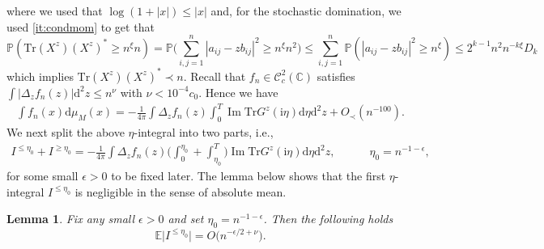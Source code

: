 \documentclass[10pt,reqno]{amsart}
\renewcommand{\Im}{\operatorname{Im}}
\newcommand{\C}{{\mathbb{C}}}
\newcommand{\II}{I^{\geq \eta_0}} %
\newcommand{\dd}{\mathrm{d}}
\newcommand{\ii}{\mathrm{i}}
\newcommand{\ie}{i.e., }
\newcommand{\<}{\langle}
\renewcommand{\>}{\rangle}
\numberwithin{equation}{section}
\newtheorem{lemma}[theorem]{Lemma}%
\begin{document}
where we used that $\log(1+|x|)\leq |x|$ and, for
the stochastic domination, we used 
\ref{it:condmom} to get that
\begin{equation}
\mathbb P(\mathrm{Tr}(X^{z})(X^{z})^* \geq n^\xi n)
= \mathbb P\Bigr(\sum_{i,j=1}^n |a_{ij} - z b_{ij}|^2
\geq n^\xi n^2\Bigr) \leq  \sum_{i,j=1}^n 
\mathbb P (|a_{ij} - z b_{ij}|^2 \geq n^\xi)
\leq 2^{k-1} n^2 n^{-k \xi} D_k
\end{equation}
which implies $\mathrm{Tr}(X^{z})(X^{z})^*\prec n$.
Recall that $f_n \in\mathcal{C}^2_c(\C)$ 
satisfies $\int |\Delta_z f_n(z)| \dd^2 z \leq n^{\nu}$ with $\nu<10^{-4}c_0$. Hence we have 
\begin{align}
     \int f_n(x)\dd\mu_M(x)=-\frac{1}{4\pi} \int \Delta_z f_n(z) \int_{0}^{T} \Im \mathrm{Tr} G^{z}(\ii \eta) \dd \eta \dd^2 z+O_\prec(n^{-100}). %
\end{align}
We next split the above $\eta$-integral into two parts, \ie 
\begin{align}\label{split_I}
    I^{\leq\eta_0}+\II=-\frac{1}{4\pi} \int \Delta_z f_n(z) \Big(  \int_{0}^{\eta_0}+\int_{\eta_0}^{T}\Big) \Im \mathrm{Tr} G^{z}(\ii \eta) \dd \eta \dd^2 z, \quad\qquad \eta_0=n^{-1-\epsilon},
\end{align}
 for some small $\epsilon>0$ to be fixed later. The lemma below shows that the first $\eta$-integral $I^{\leq\eta_0}$ is negligible in the sense of absolute mean.

\begin{lemma}\label{lemma_tiny}
Fix any small $\epsilon>0$ and set $\eta_0=n^{-1-\epsilon}$. Then the following holds
$$\mathbb{E}\big|I^{\leq\eta_0}\big|=O\big( n^{-\epsilon/2+\nu}\big).$$
\end{lemma}
\end{document}
